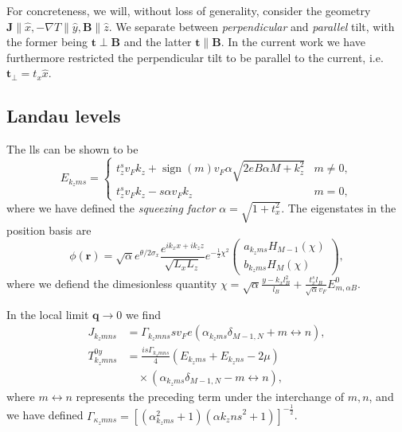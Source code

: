 \documentclass[%
 reprint,
 amsmath,amssymb,
 aps,
]{revtex4-2}
\renewcommand\vec\bm  %
\DeclareMathOperator\sign{sign}
\begin{document}
For concreteness, we will, without loss of generality, consider the geometry \( \vec{J} \parallel \hat{x}, -\nabla T \parallel \hat{y}, \vec{B} \parallel \hat{z} \).
We separate between \emph{perpendicular} and \emph{parallel} tilt, with the former being \( \vec{t} \perp \vec{B}
\) and the latter \( \vec{t} \parallel \vec{B} \).
In the current work we have furthermore restricted the perpendicular tilt to be parallel to the current, i.e. \( \vec{t}_{\perp} = t_x \hat{x} \).

\subsection{Landau levels}
The \glspl{ll} can be shown to be
\begin{equation}
  \label{eq:eigenlevels}
  E_{k_z m s} =
  \begin{cases}
    t_z^s v_F k_z + \sign(m) v_F \alpha \sqrt{2 e B \alpha M + k_z^2} & m \neq 0,\\
    t_z^s v_F k_z - s \alpha v_F k_z & m = 0,
  \end{cases}
\end{equation}
where we have defined the \emph{squeezing factor} \( \alpha = \sqrt{1 + t_x^2} \).
The eigenstates in the position basis are
\begin{equation}
  \label{eq:eigenstates}
  \phi(\vec{r}) = \sqrt{\alpha} e^{\theta / 2 \sigma_x} \frac{e^{i k_x x + ik_z z }}{\sqrt{L_{x} L_{z}}} e^{- \frac{1}{2} \chi^2}
  \begin{pmatrix}
    a_{k_z m s} H_{M-1} (\chi)\\
    b_{k_z m s} H_M (\chi)
  \end{pmatrix},
\end{equation}
where we defiend the dimesionless quantity \( \chi = \sqrt{\alpha} \frac{y-k_{x}l_B^2}{l_{B}} + \frac{t_x^s l_B}{\sqrt{\alpha} v_{F}} E^0_{m, \alpha B} \).

In the local limit \( \vec{q} \to 0 \) we find
\begin{align}
  \label{eq:1}
  J_{k_z m n s} &= \Gamma_{k_z m n s} s v_F e ( \alpha_{k_z m s } \delta_{M-1, N} + m \leftrightarrow n),\\
  T_{k_z m n s}^{0y} &= \frac{i s \Gamma_{k_z m n s}}{4} (E_{k_z m s} + E_{k_z n s} - 2 \mu )\\
                  \nonumber&\quad\times (\alpha_{k_z m s} \delta_{M-1, N} - m \leftrightarrow n),
\end{align}
where \( m \leftrightarrow n  \) represents the preceding term under the interchange of \( m,n \), and we have defined \( \Gamma_{\kappa_z m n s} = \left[(\alpha_{k_z m s}^2 + 1) (\alpha{k_z n s}^2 + 1)\right]^{-\frac{1}{2}} \).
\end{document}
